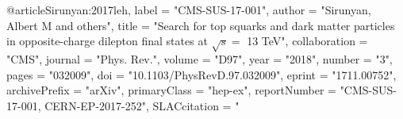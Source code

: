 @article{Sirunyan:2017leh,
      label          = "CMS-SUS-17-001",
      author         = "Sirunyan, Albert M and others",
      title          = "{Search for top squarks and dark matter particles in
                        opposite-charge dilepton final states at $\sqrt{s}=$ 13
                        TeV}",
      collaboration  = "CMS",
      journal        = "Phys. Rev.",
      volume         = "D97",
      year           = "2018",
      number         = "3",
      pages          = "032009",
      doi            = "10.1103/PhysRevD.97.032009",
      eprint         = "1711.00752",
      archivePrefix  = "arXiv",
      primaryClass   = "hep-ex",
      reportNumber   = "CMS-SUS-17-001, CERN-EP-2017-252",
      SLACcitation   = "%
}

